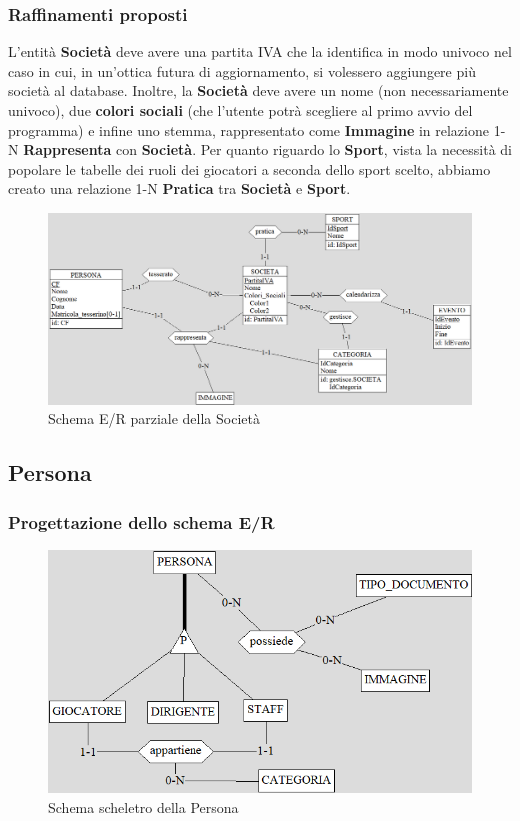 \documentclass[a4paper,12pt]{report}
\begin{document}
\subsubsection{Raffinamenti proposti}
L'entità \textbf{Società} deve avere una partita IVA che la identifica in modo univoco nel caso in cui, in un'ottica futura di aggiornamento, si volessero aggiungere più società al database. Inoltre, la \textbf{Società} deve avere un nome (non necessariamente univoco), due \textbf{colori sociali} (che l'utente potrà scegliere al primo avvio del programma) e infine uno stemma, rappresentato come \textbf{Immagine} in relazione 1-N \textbf{Rappresenta} con \textbf{Società}. \newline \newline
Per quanto riguardo lo \textbf{Sport}, vista la necessità di popolare le tabelle dei ruoli dei giocatori a seconda dello sport scelto, abbiamo creato una relazione 1-N \textbf{Pratica} tra \textbf{Società} e \textbf{Sport}.
\begin{figure}[htp]
    \centering
    \includegraphics[width = \textwidth]{GSS_report/img/societa_raffinamento.png}
    \caption{Schema E/R parziale della Società}
    \label{fig:umlAnalisys}
\end{figure}

\newpage
\subsection{Persona}
\subsubsection{Progettazione dello schema E/R}
\begin{figure}[htp]
    \centering
    \includegraphics[width = \textwidth]{GSS_report/img/persona.png}
    \caption{Schema scheletro della Persona}
    \label{fig:umlAnalisys}
\end{figure}
\end{document}
